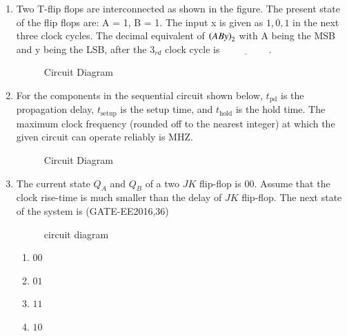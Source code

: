 \begin{enumerate}
\item Two T-flip flops are interconnected as shown in the figure. The present state of the flip flops are: A = 1, B = 1. The input x is given as $1, 0, 1$ in the next three clock cycles. The decimal equivalent of $\left(ABy\right)_{2}$ with A being the MSB and y being the LSB, after the $3_{rd}$ clock cycle is $\underline{\hspace{2cm}}$.
\hfill{}
\begin{figure}[H]

\caption{Circuit Diagram}

\end{figure}

\item For the components in the sequential circuit shown below, $t_{\text{pd}}$ is the propagation delay, $t_{\text{setup}}$ is the setup time, and $t_{\text{hold}}$ is the hold time. The maximum clock frequency (rounded off to the nearest integer) at which the given circuit can operate reliably is \underline{\hspace{1cm}}MHZ.
\hfill{}

\begin{figure}[H]

\caption{Circuit Diagram}

\end{figure}

\item The current state $Q_A$ and $Q_B$ of a two $JK$ flip-flop is $00$. Assume that the clock rise-time is much smaller than the delay of $JK$ flip-flop. The next state of the system is 
\hfill(GATE-EE2016,36) 
\begin{figure}[H]

\caption{circuit diagram} 
\label{fig:block_diagram}
\end{figure}
\begin{enumerate}[label=(\Alph*)]
\item $00$ \item $01$ \item $11$ \item $10$
\end{enumerate}





















\end{enumerate}
